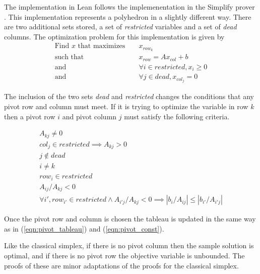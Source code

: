 \documentclass[11pt]{article} %
\begin{document}
The implementation in Lean follows the implemenentation in the Simplify prover \cite{simplify}. This implementation represents a polyhedron in a slightly different way. There are two additional sets stored, a set of \textit{restricted} variables and a set of \textit{dead} columns.
The optimization problem for this implementation is given by
\begin{equation}
  \begin{aligned}
  \text{Find } x \text{ that maximizes } && x_{row_k} \\
  \text{such that } && x_{row} = A x_{col} + b \\
  \text{and } && \forall i \in restricted, x_i \ge 0 \\
  \text{and } && \forall j \in dead, x_{col_j} = 0
  \end{aligned}
\end{equation}

The inclusion of the two sets \textit{dead} and \textit{restricted} changes the conditions that any pivot row and column must meet. If it is trying to optimize the variable in row $k$ then a pivot row $i$ and pivot column $j$ must satisfy the following criteria.

\begin{equation}
  \begin{aligned}
    A_{kj} \ne 0 \\
    col_j \in restricted \implies A_{kj} > 0 \\
    j \notin dead \\
    i \ne k \\
    row_i \in restricted \\
    A_{ij} / A_{kj} < 0 \\
    \forall i', row_{i'} \in restricted \wedge A_{i'j} / A_{kj} < 0 \implies \left|b_i/A_{ij}\right| \le \left|b_{i'} / A_{i'j}\right|
  \end{aligned}
\end{equation}

Once the pivot row and column is chosen the tableau is updated in the same way as in (\ref{eqn:pivot_tableau}) and (\ref{eqn:pivot_const}).

Like the classical simplex, if there is no pivot column then the sample solution is optimal, and if there is no pivot row the objective variable is unbounded. The proofs of these are minor adaptations of the proofs for the classical simplex.
\end{document}
